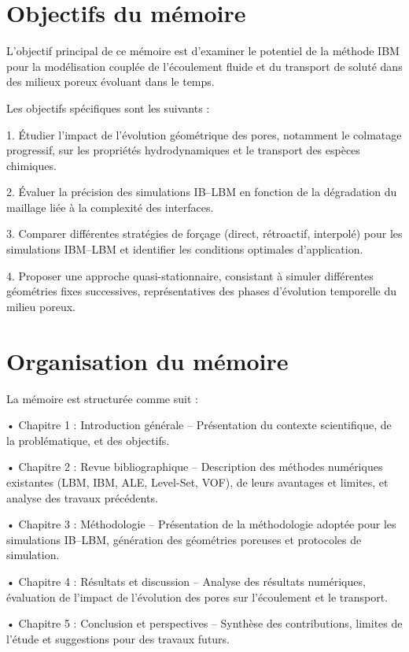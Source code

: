 \documentclass[12pt,a4paper]{report}
\begin{document}
\section{Objectifs du mémoire}
L’objectif principal de ce mémoire est d’examiner le potentiel de la méthode IBM pour la modélisation couplée de l’écoulement fluide et du transport de soluté dans des milieux poreux évoluant dans le temps.

Les objectifs spécifiques sont les suivants :

	1.	Étudier l’impact de l’évolution géométrique des pores, notamment le colmatage progressif, sur les propriétés hydrodynamiques et le transport des espèces chimiques.
    
	2.	Évaluer la précision des simulations IB–LBM en fonction de la dégradation du maillage liée à la complexité des interfaces.
    
	3.	Comparer différentes stratégies de forçage (direct, rétroactif, interpolé) pour les simulations IBM–LBM et identifier les conditions optimales d’application.
    
	4.	Proposer une approche quasi-stationnaire, consistant à simuler différentes géométries fixes successives, représentatives des phases d’évolution temporelle du milieu poreux.
    


\section{Organisation du mémoire}
La mémoire est structurée comme suit :

	•	Chapitre 1 : Introduction générale 
    – Présentation du contexte scientifique, de la problématique, et des objectifs.
    
	•	Chapitre 2 : Revue bibliographique 
    – Description des méthodes numériques existantes (LBM, IBM, ALE, Level-Set, VOF), de leurs avantages et limites, et analyse des travaux précédents.
    
	•	Chapitre 3 : Méthodologie 
    – Présentation de la méthodologie adoptée pour les simulations IB–LBM, génération des géométries poreuses et protocoles de simulation.
    
	•	Chapitre 4 : Résultats et discussion
    – Analyse des résultats numériques, évaluation de l’impact de l’évolution des pores sur l’écoulement et le transport.
    
	•	Chapitre 5 : Conclusion et perspectives
    – Synthèse des contributions, limites de l’étude et suggestions pour des travaux futurs.
    
\end{document}
